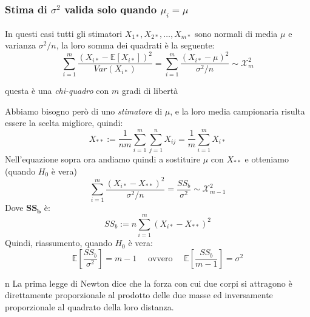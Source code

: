 \documentclass[]{article}
\newcommand{\ev}{\mathbb{E}[X]}
\renewcommand{\ev}[1]{\mathbb{E}\left[#1\right]}
\begin{document}
    \subsubsection{Stima di $\sigma^2$ valida solo quando $\mu_i = \mu$}
    In questi casi tutti gli stimatori $X_{1*}, X_{2*}, \ldots, X_{m*}$ sono normali di media $\mu$ e varianza $\sigma^2/n$, la loro somma dei quadrati è la seguente:
    \[ \sum_{i=1}^{m} \frac{(X_{i*} - \ev{X_{i*}})^2}{Var(X_{i*})} = \sum_{i=1}^{m} \frac{(X_{i*} - \mu)^2}{\sigma^2 / n} \sim \mathcal{X}^2_m \]
    \centerline{questa è una \textit{chi-quadro} con $m$ gradi di libertà}
    Abbiamo bisogno però di uno \textit{stimatore} di $\mu$, e la loro media campionaria risulta essere la scelta migliore, quindi:
    \[ X_{**} := \frac{1}{nm} \sum_{i=1}^{m} \sum_{j=1}^{n} X_{ij} = \frac{1}{m} \sum_{i=1}^{m} X_{i*} \]
    Nell'equazione sopra ora andiamo quindi a sostituire $\mu$ con $X_{**}$ e otteniamo (quando $H_0$ è vera) 
    \[ \sum_{i=1}^{m} \frac{(X_{i*} - X_{**})^2}{\sigma^2 / n} = \frac{SS_b}{\sigma^2} \sim \mathcal{X}^2_{m-1} \]
    Dove $\boldsymbol{SS_b}$ è:
    \[ SS_b := n \sum_{i=1}^{m} (X_{i*} - X_{**})^2 \]
    Quindi, riassumento, quando $H_0$ è vera:
    \[ \ev{\frac{SS_b}{\sigma^2}} = m -1 \quad \text{ ovvero } \quad \ev{\frac{SS_b}{m-1}} = \sigma^2 \]






















    n
    La prima legge di Newton dice che la forza con cui due corpi si attragono è direttamente proporzionale al prodotto delle due masse ed inversamente proporzionale al quadrato della loro distanza.
\end{document}
